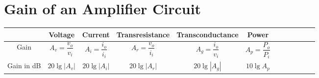 \section{Gain of an Amplifier Circuit}

\begin{table*}[htbp]
  \centering
  \begin{tabular}{|Sc|Sc|Sc|Sc|Sc|Sc|}
    \hline
    & Voltage & Current & Transresistance & Transconductance & Power \\
    \hline
    Gain & $A_v = \dfrac{v_o}{v_i}$ & $A_i = \dfrac{i_o}{i_i}$ & $A_r = \dfrac{v_o}{i_i}$ & $A_g = \dfrac{i_o}{v_i}$ & $A_p = \dfrac{P_o}{P_i}$ \\
    \hline
    Gain in dB & $20\lg \left| A_v \right|$ & $20\lg \left| A_i \right|$ & $20\lg \left| A_r \right|$ & $20\lg \left| A_g \right|$ & $10\lg A_p$ \\
    \hline
  \end{tabular}
\end{table*}


